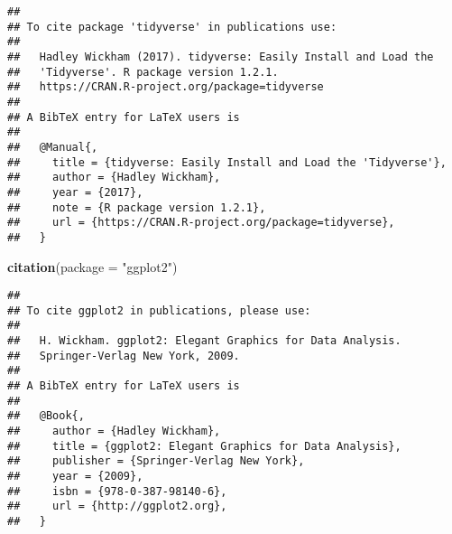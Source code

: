 \documentclass[]{article}
\newenvironment{Shaded}{\begin{snugshade}}{\end{snugshade}}
\newcommand{\KeywordTok}[1]{\textcolor[rgb]{0.13,0.29,0.53}{\textbf{#1}}}
\newcommand{\DataTypeTok}[1]{\textcolor[rgb]{0.13,0.29,0.53}{#1}}
\newcommand{\StringTok}[1]{\textcolor[rgb]{0.31,0.60,0.02}{#1}}
\newcommand{\NormalTok}[1]{#1}
\begin{document}
\begin{verbatim}
## 
## To cite package 'tidyverse' in publications use:
## 
##   Hadley Wickham (2017). tidyverse: Easily Install and Load the
##   'Tidyverse'. R package version 1.2.1.
##   https://CRAN.R-project.org/package=tidyverse
## 
## A BibTeX entry for LaTeX users is
## 
##   @Manual{,
##     title = {tidyverse: Easily Install and Load the 'Tidyverse'},
##     author = {Hadley Wickham},
##     year = {2017},
##     note = {R package version 1.2.1},
##     url = {https://CRAN.R-project.org/package=tidyverse},
##   }
\end{verbatim}

\begin{Shaded}
\begin{Highlighting}[]
\KeywordTok{citation}\NormalTok{(}\DataTypeTok{package =} \StringTok{"ggplot2"}\NormalTok{)}
\end{Highlighting}
\end{Shaded}

\begin{verbatim}
## 
## To cite ggplot2 in publications, please use:
## 
##   H. Wickham. ggplot2: Elegant Graphics for Data Analysis.
##   Springer-Verlag New York, 2009.
## 
## A BibTeX entry for LaTeX users is
## 
##   @Book{,
##     author = {Hadley Wickham},
##     title = {ggplot2: Elegant Graphics for Data Analysis},
##     publisher = {Springer-Verlag New York},
##     year = {2009},
##     isbn = {978-0-387-98140-6},
##     url = {http://ggplot2.org},
##   }
\end{verbatim}
\end{document}
